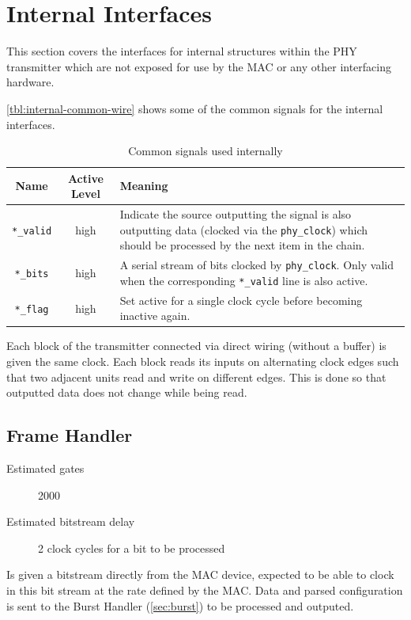 \documentclass[dvips,10pt,twocolumn]{article}
\newcommand{\wire}{\texttt}
\begin{document}
\section{Internal Interfaces}
This section covers the interfaces for internal structures within the PHY
transmitter which are not exposed for use by the MAC or any other interfacing
hardware.

\autoref{tbl:internal-common-wire} shows some of the common signals for
the internal interfaces.

\begin{table}
\begin{tabulary}{\linewidth}{c|C|L}
	\label{tbl:internal-common-wire}
	Name & Active Level & Meaning \\ \hline
	
	\wire{*\_valid} & high & Indicate the source outputting the signal
	is also outputting data (clocked via the \wire{phy\_clock}) which
	should be processed by the next item in the chain. \\

	\wire{*\_bits} & high & A serial stream of bits clocked by
	\wire{phy\_clock}. Only valid when the corresponding
	\wire{*\_valid} line is also active. \\

	\wire{*\_flag} & high & Set active for a single clock cycle
	before becoming inactive again.
\end{tabulary}
\caption{Common signals used internally}
\end{table}

Each block of the transmitter connected via direct wiring (without a
buffer) is given the same clock. Each block reads its inputs on alternating
clock edges such that two adjacent units read and write on different edges.
This is done so that outputted data does not change while being read.


\subsection{Frame Handler}
\begin{description}
	\item[Estimated gates] 2000
	\item[Estimated bitstream delay] 2 clock cycles for a bit to be
		processed 
\end{description}

Is given a bitstream directly from the MAC device, expected to be able to
clock in this bit stream at the rate defined by the MAC. Data and
parsed configuration is sent to the Burst Handler (\autoref{sec:burst})
to be processed and outputed.
\end{document}
